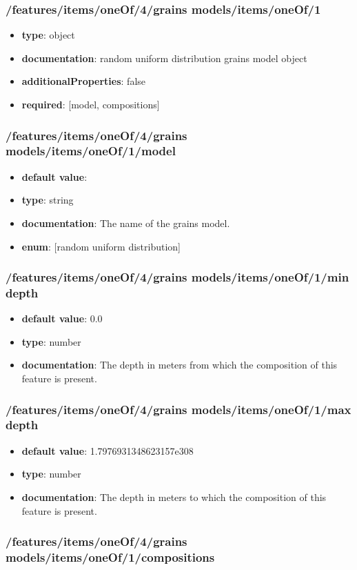 \subsubsection{/features/items/oneOf/4/grains models/items/oneOf/1}
\begin{itemize}\item {\bf type}: object
\item {\bf documentation}: random uniform distribution grains model object
\item {\bf additionalProperties}: false
\item {\bf required}: [model, compositions]\end{itemize}
\subsubsection{/features/items/oneOf/4/grains models/items/oneOf/1/model}
\begin{itemize}\item {\bf default value}: 
\item {\bf type}: string
\item {\bf documentation}: The name of the grains model.
\item {\bf enum}: [random uniform distribution]\end{itemize}\subsubsection{/features/items/oneOf/4/grains models/items/oneOf/1/min depth}
\begin{itemize}\item {\bf default value}: 0.0
\item {\bf type}: number
\item {\bf documentation}: The depth in meters from which the composition of this feature is present.
\end{itemize}\subsubsection{/features/items/oneOf/4/grains models/items/oneOf/1/max depth}
\begin{itemize}\item {\bf default value}: 1.7976931348623157e308
\item {\bf type}: number
\item {\bf documentation}: The depth in meters to which the composition of this feature is present.
\end{itemize}\subsubsection{/features/items/oneOf/4/grains models/items/oneOf/1/compositions}
